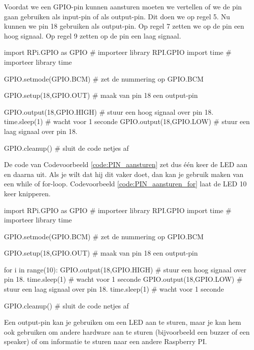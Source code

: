 \documentclass{guide}
\begin{document}
Voordat we een GPIO-pin kunnen aansturen moeten we vertellen of we de pin gaan gebruiken als input-pin of als output-pin. Dit doen we op regel 5. Nu kunnen we pin 18 gebruiken als output-pin. Op regel 7 zetten we op de pin een hoog signaal. Op regel 9 zetten op de pin een laag signaal. 

\begin{python}[caption={De GPIO library inladen}, label=code:PIN_aansturen]
import RPi.GPIO as GPIO   # importeer library RPI.GPIO
import time               # importeer library time

GPIO.setmode(GPIO.BCM)    # zet de nummering op GPIO.BCM

GPIO.setup(18,GPIO.OUT)   # maak van pin 18 een output-pin

GPIO.output(18,GPIO.HIGH) # stuur een hoog signaal over pin 18.
time.sleep(1)             # wacht voor 1 seconde
GPIO.output(18,GPIO.LOW)  # stuur een laag signaal over pin 18.

GPIO.cleanup()            # sluit de code netjes af
\end{python}

\noindent De code van Codevoorbeeld \ref{code:PIN_aansturen} zet dus één keer de LED aan en daarna uit. Als je wilt dat hij dit vaker doet, dan kan je gebruik maken van een while of for-loop. Codevoorbeeld \ref{code:PIN_aansturen_for} laat de LED 10 keer knipperen. 

\begin{python}[caption={De GPIO library inladen}, label=code:PIN_aansturen_for]
import RPi.GPIO as GPIO     # importeer library RPI.GPIO
import time                 # importeer library time

GPIO.setmode(GPIO.BCM)      # zet de nummering op GPIO.BCM

GPIO.setup(18,GPIO.OUT)     # maak van pin 18 een output-pin

for i in range(10):
  GPIO.output(18,GPIO.HIGH) # stuur een hoog signaal over pin 18.
  time.sleep(1)             # wacht voor 1 seconde
  GPIO.output(18,GPIO.LOW)  # stuur een laag signaal over pin 18.
    time.sleep(1)           # wacht voor 1 seconde

GPIO.cleanup()              # sluit de code netjes af
\end{python}

\noindent Een output-pin kan je gebruiken om een LED aan te sturen, maar je kan hem ook gebruiken om andere hardware aan te sturen (bijvoorbeeld een buzzer of een speaker) of om informatie te sturen naar een andere Raspberry PI.
\end{document}
